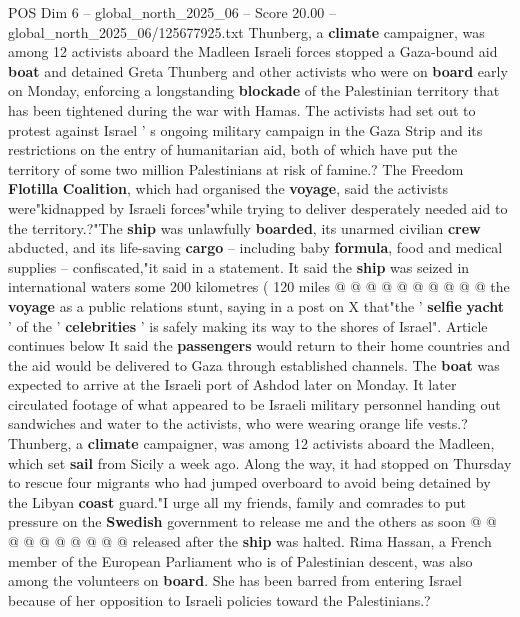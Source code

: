 \begin{textsample}{POS Dim 6 – global\_north\_2025\_06 – Score 20.00 – global\_north\_2025\_06/125677925.txt}  \label{ex:f6_pos_022}
Thunberg, a \textbf{climate} campaigner, was among 12 activists aboard the Madleen Israeli forces stopped a Gaza-bound aid \textbf{boat} and detained Greta Thunberg and other activists who were on \textbf{board} early on Monday, enforcing a longstanding \textbf{blockade} of the Palestinian territory that has been tightened during the war with Hamas.
The activists had set out to protest against Israel ' s ongoing military campaign in the Gaza Strip and its restrictions on the entry of humanitarian aid, both of which have put the territory of some two million Palestinians at risk of famine.?
The Freedom \textbf{Flotilla} \textbf{Coalition}, which had organised the \textbf{voyage}, said the activists were"kidnapped by Israeli forces"while trying to deliver desperately needed aid to the territory.?"The \textbf{ship} was unlawfully \textbf{boarded}, its unarmed civilian \textbf{crew} abducted, and its life-saving \textbf{cargo} -- including baby \textbf{formula}, food and medical supplies -- confiscated,"it said in a statement.
It said the \textbf{ship} was seized in international waters some 200 kilometres ( 120 miles @ @ @ @ @ @ @ @ @ @ the \textbf{voyage} as a public relations stunt, saying in a post on X that"the ' \textbf{selfie} \textbf{yacht} ' of the ' \textbf{celebrities} ' is safely making its way to the shores of Israel".
Article continues below It said the \textbf{passengers} would return to their home countries and the aid would be delivered to Gaza through established channels.
The \textbf{boat} was expected to arrive at the Israeli port of Ashdod later on Monday.
It later circulated footage of what appeared to be Israeli military personnel handing out sandwiches and water to the activists, who were wearing orange life vests.?
Thunberg, a \textbf{climate} campaigner, was among 12 activists aboard the Madleen, which set \textbf{sail} from Sicily a week ago.
Along the way, it had stopped on Thursday to rescue four migrants who had jumped overboard to avoid being detained by the Libyan \textbf{coast} guard."I urge all my friends, family and comrades to put pressure on the \textbf{Swedish} government to release me and the others as soon @ @ @ @ @ @ @ @ @ @ released after the \textbf{ship} was halted.
Rima Hassan, a French member of the European Parliament who is of Palestinian descent, was also among the volunteers on \textbf{board}.
She has been barred from entering Israel because of her opposition to Israeli policies toward the Palestinians.?

\end{textsample}
